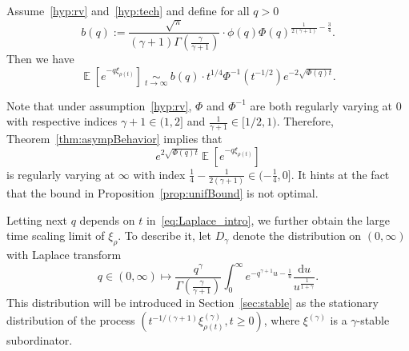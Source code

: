 \documentclass[AHL,Unicode,longabstracts,published]{cedram}
\DeclareMathOperator{\E}{\mathbb{E}}
\newcommand{\dd}{\mathrm{d}}
\begin{document}
\begin{theo}\label{thm:asympBehavior}
Assume~\eqref{hyp:rv} and~\eqref{hyp:tech} and define for all $q > 0$
\begin{equation*}\label{eqn:defcq}
b(q) := \frac{\sqrt{\pi}}{(\gamma+1)\Gamma\left(\frac{\gamma}{\gamma + 1}\right)} \cdot \phi(q) \Phi(q)^{\frac{1}{2(\gamma + 1)} - \frac{3}{4}}.
\end{equation*}
Then we have
\[
\E\left[e^{-q \xi_{\rho(t)}}\right]~\underset{t \to \infty} \sim~b(q)\cdot t^{1/4} \Phi^{-1}\left(t^{-1/2}\right) e^{-2 \sqrt{\Phi(q)t}}.
\]
\end{theo}


\begin{rema}
Note that under assumption~\eqref{hyp:rv}, $\Phi$ and $\Phi^{-1}$ are both regularly varying at $0$ with respective indices $\gamma + 1 \in (1,2]$ and $\frac{1}{\gamma+1} \in [1/2,1)$. Therefore, Theorem~\ref{thm:asympBehavior} implies that 
\[
e^{2\sqrt{\Phi(q)t}} \E\left[e^{-q \xi_{\rho(t)}}\right]
\]
is regularly varying at $\infty$ with index $\frac{1}{4}-\frac{1}{2(\gamma+1)} \in (-\frac{1}{4},0]$. It hints at the fact that the bound in Proposition~\ref{prop:unifBound} is not optimal.
\end{rema}



Letting next $q$ depends on $t$ in~\eqref{eq:Laplace_intro}, we further obtain the large time scaling limit of $\xi_{\rho}$. To describe it, let $D_{\gamma}$ denote the distribution on $(0,\infty)$ with Laplace transform
\[
q \in (0,\infty) \mapsto \frac{q^{\gamma}}{\Gamma\left(\frac{\gamma}{\gamma+1} \right)} \int_0^{\infty} e^{-q^{\gamma+1}u-\frac{1}{u}} \frac{ \dd u}{u^{\frac{1}{1+\gamma}}}.
\]
This distribution will be introduced in Section~\ref{sec:stable} as the stationary distribution of the process $(t^{-1/(\gamma+1)}\xi^{(\gamma)}_{\rho(t)}, t\geq 0)$, where $\xi^{(\gamma)}$ is a $\gamma$-stable subordinator.
\end{document}
